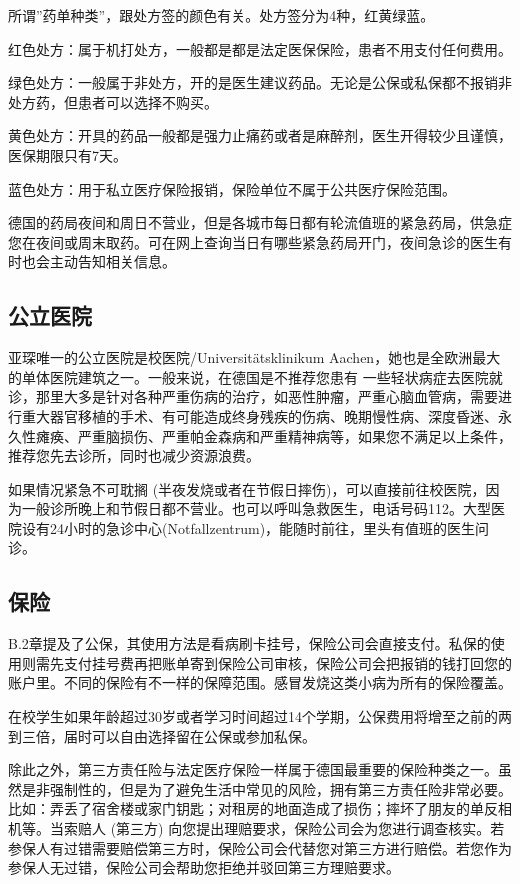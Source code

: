     所谓”药单种类”，跟处方签的颜色有关。处方签分为4种，红黄绿蓝。

    红色处方：属于机打处方，一般都是都是法定医保保险，患者不用支付任何费用。

    绿色处方：一般属于非处方，开的是医生建议药品。无论是公保或私保都不报销非处方药，但患者可以选择不购买。

    黄色处方：开具的药品一般都是强力止痛药或者是麻醉剂，医生开得较少且谨慎，医保期限只有7天。

    蓝色处方：用于私立医疗保险报销，保险单位不属于公共医疗保险范围。

    德国的药局夜间和周日不营业，但是各城市每日都有轮流值班的紧急药局，供急症您在夜间或周末取药。可在网上查询当日有哪些紧急药局开门，夜间急诊的医生有时也会主动告知相关信息。

  \subsection{公立医院}

    亚琛唯一的公立医院是校医院/Universitätsklinikum Aachen，她也是全欧洲最大的单体医院建筑之一。一般来说，在德国是不推荐您患有 一些轻状病症去医院就诊，那里大多是针对各种严重伤病的治疗，如恶性肿瘤，严重心脑血管病，需要进行重大器官移植的手术、有可能造成终身残疾的伤病、晚期慢性病、深度昏迷、永久性瘫痪、严重脑损伤、严重帕金森病和严重精神病等，如果您不满足以上条件，推荐您先去诊所，同时也减少资源浪费。

    如果情况紧急不可耽搁 (半夜发烧或者在节假日摔伤)，可以直接前往校医院，因为一般诊所晚上和节假日都不营业。也可以呼叫急救医生，电话号码112。大型医院设有24小时的急诊中心(Notfallzentrum)，能随时前往，里头有值班的医生问诊。

  \subsection{保险}

    B.2章提及了公保，其使用方法是看病刷卡挂号，保险公司会直接支付。私保的使用则需先支付挂号费再把账单寄到保险公司审核，保险公司会把报销的钱打回您的账户里。不同的保险有不一样的保障范围。感冒发烧这类小病为所有的保险覆盖。

    在校学生如果年龄超过30岁或者学习时间超过14个学期，公保费用将增至之前的两到三倍，届时可以自由选择留在公保或参加私保。

    除此之外，第三方责任险与法定医疗保险一样属于德国最重要的保险种类之一。虽然是非强制性的，但是为了避免生活中常见的风险，拥有第三方责任险非常必要。比如：弄丢了宿舍楼或家门钥匙；对租房的地面造成了损伤；摔坏了朋友的单反相机等。当索赔人 (第三方) 向您提出理赔要求，保险公司会为您进行调查核实。若参保人有过错需要赔偿第三方时，保险公司会代替您对第三方进行赔偿。若您作为参保人无过错，保险公司会帮助您拒绝并驳回第三方理赔要求。

